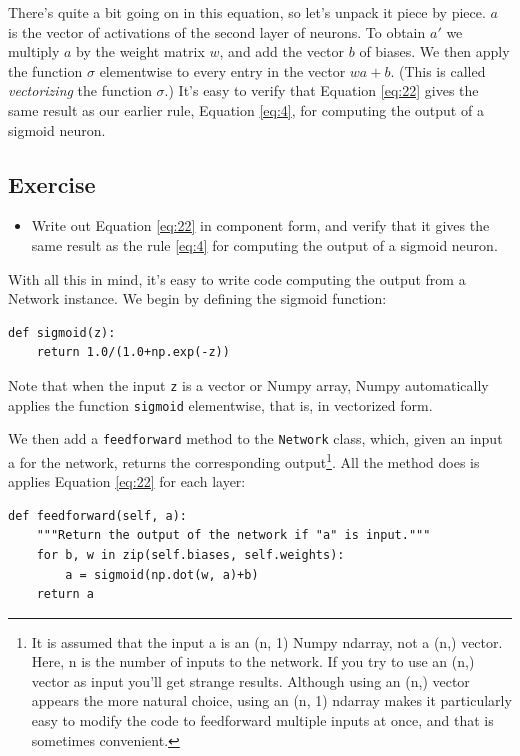 \documentclass[a4paper,twoside,10pt]{book}
\begin{document}
There's quite a bit going on in this equation, so let's unpack it piece by piece. $a$ is the vector of activations of the second layer of neurons. To obtain $a'$ we multiply $a$ by the weight matrix $w$, and add the vector $b$ of biases. We then apply the function $\sigma$ elementwise to every entry in the vector $wa+b$. (This is called \textit{vectorizing} the function $\sigma$.) It's easy to verify that Equation \ref{eq:22} gives the same result as our earlier rule, Equation \ref{eq:4}, for computing the output of a sigmoid neuron.

\subsection*{Exercise}
\begin{itemize}
\item  Write out Equation \ref{eq:22} in component form, and verify that it gives the same result as the rule \ref{eq:4} for computing the output of a sigmoid neuron.

\end{itemize}
With all this in mind, it's easy to write code computing the output from a Network instance. We begin by defining the sigmoid function:
\begin{lstlisting}
def sigmoid(z):
	return 1.0/(1.0+np.exp(-z))
\end{lstlisting}
Note that when the input \texttt{z} is a vector or Numpy array, Numpy automatically applies the function \texttt{sigmoid} elementwise, that is, in vectorized form.

We then add a \texttt{feedforward} method to the \texttt{Network} class, which, given an input a for the network, returns the corresponding output\footnote{It is assumed that the input a is an (n, 1) Numpy ndarray, not a (n,) vector. Here, n is the number of inputs to the network. If you try to use an (n,) vector as input you'll get strange results. Although using an (n,) vector appears the more natural choice, using an (n, 1) ndarray makes it particularly easy to modify the code to feedforward multiple inputs at once, and that is sometimes convenient.}. All the method does is applies Equation \ref{eq:22} for each layer:
\begin{lstlisting}
def feedforward(self, a):
	"""Return the output of the network if "a" is input."""
	for b, w in zip(self.biases, self.weights):
		a = sigmoid(np.dot(w, a)+b)	
	return a
\end{lstlisting}
\end{document}
